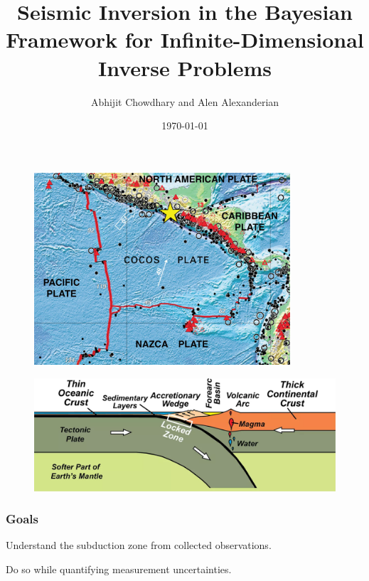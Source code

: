 \documentclass[
    pdf,
    11pt,
    xcolor={svgnames},
  ]{beamer}
\title[%
  Seismic Inversion in the Bayesian Framework
]{%
  Seismic Inversion in the Bayesian Framework for Infinite-Dimensional Inverse
  Problems
}
\author[Chowdhary, Alexanderian]{%
  Abhijit Chowdhary and Alen Alexanderian
}
\institute[NCSU]{
  Department of Mathematics \\
  North Carolina State University
}
\date[AMGSS 2022]{\today}
\begin{document}
 

\begin{frame}
  \begin{figure}
    \centering
    \includegraphics[width=0.85\textwidth]{./resources/Cocos}
    \caption{\cite{Cocos2006}}
  \end{figure}
\end{frame}

\begin{frame}
  \begin{figure}
    \centering
    \includegraphics[width=\textwidth]{./resources/subduction_zone}
    \caption{\cite{Lillie2017}}
  \end{figure}
\end{frame}

\begin{frame}
  \frametitle{Goals}
  \begin{alertblock}{}
    \begin{center}
      {\large Understand the subduction zone from collected observations.}
    \end{center}
  \end{alertblock}
  \pause
  \begin{alertblock}{}
    \begin{center}
      {\large Do so while quantifying measurement uncertainties.}
    \end{center}
  \end{alertblock}
\end{frame}
\end{document}

